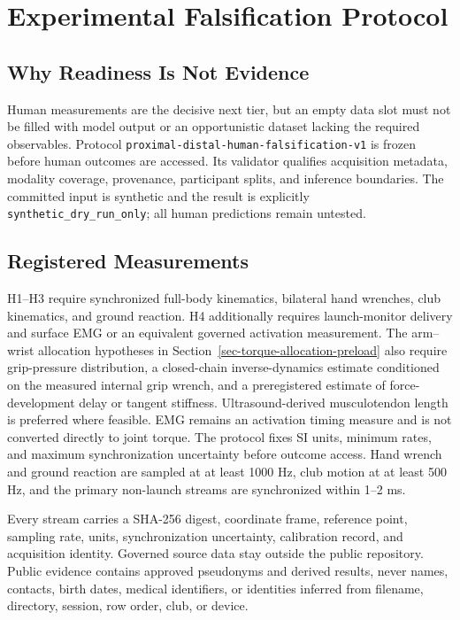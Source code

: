 \documentclass[
  letterpaper,
]{report}
\begin{document}
\chapter{Experimental Falsification
Protocol}\label{sec-experimental-protocol}

\section{Why Readiness Is Not
Evidence}\label{why-readiness-is-not-evidence}

Human measurements are the decisive next tier, but an empty data slot
must not be filled with model output or an opportunistic dataset lacking
the required observables. Protocol
\texttt{proximal-distal-human-falsification-v1} is frozen before human
outcomes are accessed. Its validator qualifies acquisition metadata,
modality coverage, provenance, participant splits, and inference
boundaries. The committed input is synthetic and the result is
explicitly \texttt{synthetic\_dry\_run\_only}; all human predictions
remain untested.

\section{Registered Measurements}\label{registered-measurements}

H1--H3 require synchronized full-body kinematics, bilateral hand
wrenches, club kinematics, and ground reaction. H4 additionally requires
launch-monitor delivery and surface EMG or an equivalent governed
activation measurement. The arm--wrist allocation hypotheses in
Section~\ref{sec-torque-allocation-preload} also require grip-pressure
distribution, a closed-chain inverse-dynamics estimate conditioned on
the measured internal grip wrench, and a preregistered estimate of
force-development delay or tangent stiffness. Ultrasound-derived
musculotendon length is preferred where feasible. EMG remains an
activation timing measure and is not converted directly to joint torque.
The protocol fixes SI units, minimum rates, and maximum synchronization
uncertainty before outcome access. Hand wrench and ground reaction are
sampled at at least 1000 Hz, club motion at at least 500 Hz, and the
primary non-launch streams are synchronized within 1--2 ms.

Every stream carries a SHA-256 digest, coordinate frame, reference
point, sampling rate, units, synchronization uncertainty, calibration
record, and acquisition identity. Governed source data stay outside the
public repository. Public evidence contains approved pseudonyms and
derived results, never names, contacts, birth dates, medical
identifiers, or identities inferred from filename, directory, session,
row order, club, or device.
\end{document}
